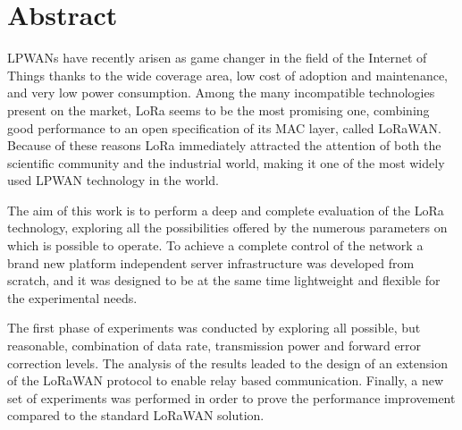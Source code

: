 \chapter*{Abstract}

LPWANs have recently arisen as game changer in the field of the Internet of Things thanks to the wide coverage area, low cost of adoption and maintenance, and very low power consumption. Among the many incompatible technologies present on the market, LoRa seems to be the most promising one, combining good performance to an open specification of its MAC layer, called LoRaWAN. Because of these reasons LoRa immediately attracted the attention of both the scientific community and the industrial world, making it one of the most widely used LPWAN technology in the world. 

The aim of this work is to perform a deep and complete evaluation of the LoRa technology, exploring all the possibilities offered by the numerous parameters on which is possible to operate. To achieve a complete control of the network a brand new platform independent server infrastructure was developed from scratch, and it was designed to be at the same time lightweight and flexible for the experimental needs.

The first phase of experiments was conducted by exploring all possible, but reasonable, combination of data rate, transmission power and forward error correction levels. The analysis of the results leaded to the design of an extension of the LoRaWAN protocol to enable relay based communication. Finally, a new set of experiments was performed in order to prove the performance improvement compared to the standard LoRaWAN solution.

